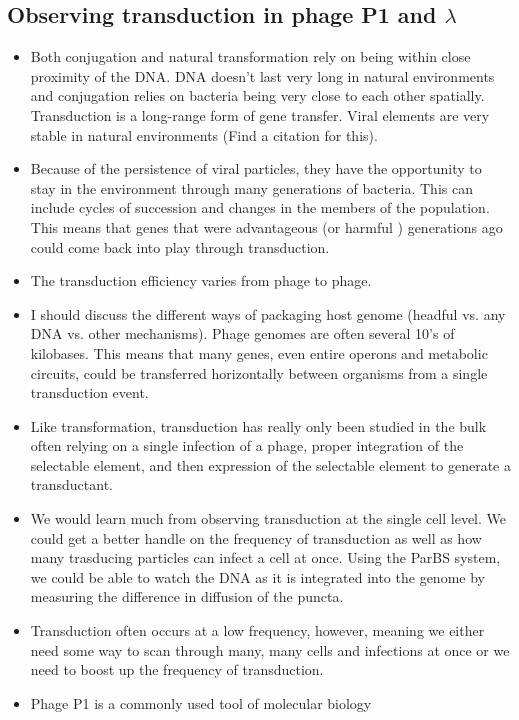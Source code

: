 \subsection*{Observing transduction in phage P1 and $\lambda$}
	\begin{itemize}
		\item Both conjugation and natural transformation rely on being
			within close proximity of the DNA. DNA doesn't last very
			long in natural environments and conjugation relies on
			bacteria being very close to each other spatially.
			Transduction is a long-range form of gene transfer.
			Viral elements are very stable in natural environments
			(Find a citation for this).
		\item Because of the persistence of viral particles, they have
			the opportunity to stay in the environment through many
			generations of bacteria. This can include cycles of
			succession and changes in the members of the population. 
			This means that genes that were advantageous (or harmful
			) generations ago could come back into play through
			transduction.
		\item The transduction efficiency varies from phage to phage. 
		\item I should discuss the different ways of packaging host
			genome (headful vs. any DNA vs. other mechanisms).
			Phage genomes are often several 10's of kilobases.
			This means that many genes, even entire operons and
			metabolic circuits, could be transferred horizontally
			between organisms from a single transduction event. 
		\item Like transformation, transduction has really only been
			studied in the bulk often relying on a single infection
			of a phage, proper integration of the selectable
			element, and then expression of the selectable element
			to generate a transductant. 
		\item We would learn much from observing transduction at the
			single cell level. We could get a better handle on the
			frequency of transduction as well as how many trasducing
			particles can infect a cell at once. Using the ParBS
			system, we could be able to watch the DNA as it is
			integrated into the genome by measuring the difference
			in diffusion of the puncta.
		\item Transduction often occurs at a low frequency, however,
			meaning we either need some way to scan through many,
			many cells and infections at once or we need to boost up
			the frequency of transduction.
		\item Phage P1 is a commonly used tool of molecular biology

\end{itemize}
